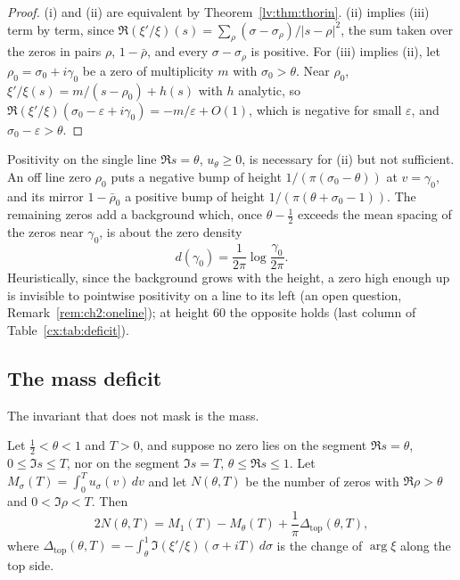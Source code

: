 \begin{proof}
(i) and (ii) are equivalent by Theorem~\ref{lv:thm:thorin}. (ii) implies (iii) term by term, since $\Re(\xi'/\xi)(s)=\sum_\rho(\sigma-\sigma_\rho)/|s-\rho|^2$, the sum taken over the zeros in pairs $\rho$, $1-\bar\rho$, and every $\sigma-\sigma_\rho$ is positive. For (iii) implies (ii), let $\rho_0=\sigma_0+i\gamma_0$ be a zero of multiplicity $m$ with $\sigma_0>\theta$. Near $\rho_0$, $\xi'/\xi(s)=m/(s-\rho_0)+h(s)$ with $h$ analytic, so $\Re(\xi'/\xi)(\sigma_0-\varepsilon+i\gamma_0)=-m/\varepsilon+O(1)$, which is negative for small $\varepsilon$, and $\sigma_0-\varepsilon>\theta$.
\end{proof}

Positivity on the single line $\Re s=\theta$, $u_\theta\ge0$, is necessary for (ii) but not sufficient. An off line zero $\rho_0$ puts a negative bump of height $1/(\pi(\sigma_0-\theta))$ at $v=\gamma_0$, and its mirror $1-\bar\rho_0$ a positive bump of height $1/(\pi(\theta+\sigma_0-1))$. The remaining zeros add a background which, once $\theta-\tfrac12$ exceeds the mean spacing of the zeros near $\gamma_0$, is about the zero density
\[
d(\gamma_0)=\frac1{2\pi}\log\frac{\gamma_0}{2\pi}.
\]
Heuristically, since the background grows with the height, a zero high enough up is invisible to pointwise positivity on a line to its left (an open question, Remark~\ref{rem:ch2:oneline}); at height $60$ the opposite holds (last column of Table~\ref{cx:tab:deficit}).

\subsection{The mass deficit}

The invariant that does not mask is the mass.

\begin{proposition}\label{cx:prop:deficit}
Let $\tfrac12<\theta<1$ and $T>0$, and suppose no zero lies on the segment $\Re s=\theta$, $0\le\Im s\le T$, nor on the segment $\Im s=T$, $\theta\le\Re s\le1$. Let $M_\sigma(T)=\int_0^Tu_\sigma(v)\,dv$ and let $N(\theta,T)$ be the number of zeros with $\Re\rho>\theta$ and $0<\Im\rho<T$. Then
\begin{equation}\label{cx:eq:deficit}
2N(\theta,T)=M_1(T)-M_\theta(T)+\frac1\pi\Delta_{\mathrm{top}}(\theta,T),
\end{equation}
where $\Delta_{\mathrm{top}}(\theta,T)=-\int_\theta^1\Im(\xi'/\xi)(\sigma+iT)\,d\sigma$ is the change of $\arg\xi$ along the top side.
\end{proposition}


